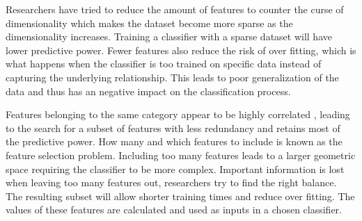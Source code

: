 Researchers have tried to reduce the amount of features to counter the curse of dimensionality which makes the dataset become more sparse as the dimensionality increases. Training a classifier with a sparse dataset will have lower predictive power. Fewer features also reduce the risk of over fitting, which is what happens when the classifier is too trained on specific data instead of capturing the underlying relationship. This leads to poor generalization of the data and thus has an negative impact on the classification process.

Features belonging to the same category appear to be highly correlated \cite{Xu201414}, leading to the search for a subset of features with less redundancy and retains most of the predictive power. How many and which features to include is known as the feature selection problem. Including too many features leads to a larger geometric space requiring the classifier to be more complex. Important information is lost when leaving too many features out, researchers try to find the right balance. The resulting subset will allow shorter training times and reduce over fitting. The values of these features are calculated and used as inputs in a chosen classifier.

